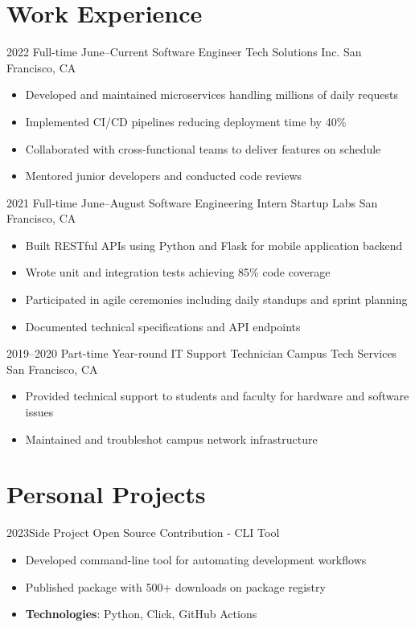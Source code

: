 \documentclass[12pt,letter,sans]{moderncv/moderncv}
\begin{document}

\section{Work Experience}

\cventry
  {2022 Full-time June--Current}
  {Software Engineer}
  {Tech Solutions Inc.}
  {San Francisco, CA}{}{%
  \begin{itemize}
    \item Developed and maintained microservices handling millions of daily requests
    \item Implemented CI/CD pipelines reducing deployment time by 40\%
    \item Collaborated with cross-functional teams to deliver features on schedule
    \item Mentored junior developers and conducted code reviews
  \end{itemize}
}

\cventry
  {2021 Full-time June--August}
  {Software Engineering Intern}
  {Startup Labs}
  {San Francisco, CA}{}{%
  \begin{itemize}
    \item Built RESTful APIs using Python and Flask for mobile application backend
    \item Wrote unit and integration tests achieving 85\% code coverage
    \item Participated in agile ceremonies including daily standups and sprint planning
    \item Documented technical specifications and API endpoints
  \end{itemize}
}

\cventry
  {2019--2020 Part-time Year-round}
  {IT Support Technician}
  {Campus Tech Services}
  {San Francisco, CA}{}{%
  \begin{itemize}
    \item Provided technical support to students and faculty for hardware and software issues
    \item Maintained and troubleshot campus network infrastructure
  \end{itemize}
}


\section{Personal Projects}
\cventry
  {2023\break Side Project}
  {Open Source Contribution - CLI Tool}{}{}{}{%
  \begin{itemize}
    \item Developed command-line tool for automating development workflows
    \item Published package with 500+ downloads on package registry
    \item \textbf{Technologies}: Python, Click, GitHub Actions
  \end{itemize}
}
\end{document}
